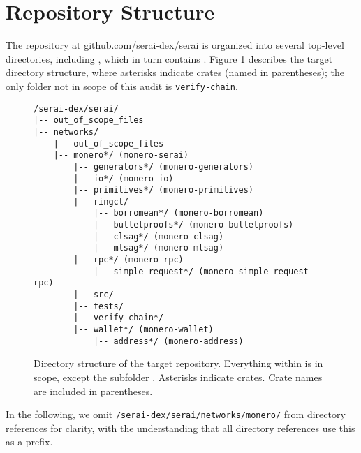 \documentclass[12pt,a4paper]{article}
\begin{document}
\section{Repository Structure}



The repository at \url{github.com/serai-dex/serai} is organized into several top-level directories, including , which in turn contains .  Figure \ref{fig:directory_structure} describes the target directory structure, where asterisks indicate crates (named in parentheses); the only folder not in scope of this audit is \texttt{verify-chain}.



\begin{figure}[h]
\centering
\begin{minipage}{0.9\linewidth}
\begin{mdframed}
\begin{verbatim}
/serai-dex/serai/
|-- out_of_scope_files
|-- networks/
    |-- out_of_scope_files
    |-- monero*/ (monero-serai)
        |-- generators*/ (monero-generators)
        |-- io*/ (monero-io)
        |-- primitives*/ (monero-primitives)
        |-- ringct/
            |-- borromean*/ (monero-borromean)
            |-- bulletproofs*/ (monero-bulletproofs)
            |-- clsag*/ (monero-clsag)
            |-- mlsag*/ (monero-mlsag)
        |-- rpc*/ (monero-rpc)
            |-- simple-request*/ (monero-simple-request-rpc)
        |-- src/
        |-- tests/
        |-- verify-chain*/
        |-- wallet*/ (monero-wallet)
            |-- address*/ (monero-address)
\end{verbatim}
\end{mdframed}
\end{minipage}
\caption{Directory structure of the target repository. Everything within \protect{} is in scope, except the subfolder \protect{}. Asterisks indicate crates. Crate names are included in parentheses.}
\label{fig:directory_structure}
\end{figure}





In the following, we omit \texttt{/serai-dex/serai/networks/monero/} from directory references for clarity, with the understanding that all directory references use this as a prefix.
\end{document}
